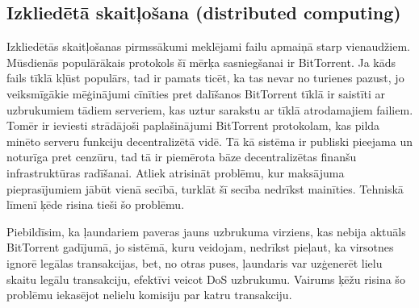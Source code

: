 \subsection{Izkliedētā skaitļošana (distributed computing)}
Izkliedētās skaitļošanas pirmssākumi meklējami failu apmaiņā starp vienaudžiem. Mūsdienās populārākais protokols šī mērķa sasniegšanai ir BitTorrent. Ja kāds fails tīklā kļūst populārs, tad ir pamats ticēt, ka tas nevar no turienes pazust, jo veiksmīgākie mēģinājumi cīnīties pret dalīšanos BitTorrent tīklā ir saistīti ar uzbrukumiem tādiem serveriem, kas uztur sarakstu ar tīklā atrodamajiem failiem. Tomēr ir ieviesti strādājoši paplašinājumi BitTorrent protokolam, kas pilda minēto serveru funkciju decentralizētā vidē.\cite{pouwelse08} Tā kā sistēma ir publiski pieejama un noturīga pret cenzūru, tad tā ir piemērota bāze decentralizētas finanšu infrastruktūras radīšanai. Atliek atrisināt problēmu, kur maksājuma pieprasījumiem jābūt vienā secībā, turklāt šī secība nedrīkst mainīties. Tehniskā līmenī ķēde risina tieši šo problēmu.

Piebildīsim, ka ļaundariem paveras jauns uzbrukuma virziens, kas nebija aktuāls BitTorrent gadījumā, jo sistēmā, kuru veidojam, nedrīkst pieļaut, ka virsotnes ignorē legālas transakcijas, bet, no otras puses, ļaundaris var uzģenerēt lielu skaitu legālu transakciju, efektīvi veicot DoS uzbrukumu. Vairums ķēžu risina šo problēmu iekasējot nelielu komisiju par katru transakciju.

